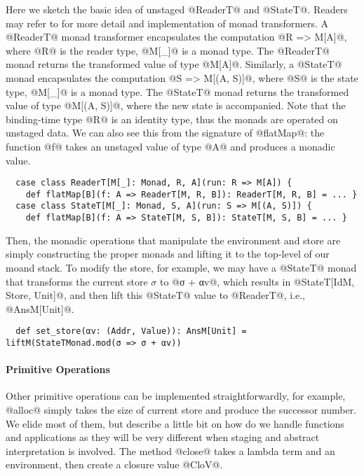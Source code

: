 Here we sketch the basic idea of unstaged @ReaderT@ and @StateT@. Readers may
refer to  for more detail and implementation of monad
transformers.
A @ReaderT@ monad transformer encapsulates the computation @R => M[A]@, where
@R@ is the reader type, @M[_]@ is a monad type. The @ReaderT@ monad returns the
transformed value of type @M[A]@. Similarly, a @StateT@ monad encapsulates the
computation @S => M[(A, S)]@, where @S@ is the state type, @M[_]@ is a monad
type. The @StateT@ monad returns the transformed value of type @M[(A, S)]@,
where the new state is accompanied.
Note that the binding-time type @R@ is an identity type, thus the monads are
operated on unstaged data. We can also see this from the signature of @flatMap@:
the function @f@ takes an unstaged value of type @A@ and produces a monadic
value.

\begin{lstlisting}
  case class ReaderT[M[_]: Monad, R, A](run: R => M[A]) {
    def flatMap[B](f: A => ReaderT[M, R, B]): ReaderT[M, R, B] = ... }
  case class StateT[M[_]: Monad, S, A](run: S => M[(A, S)]) {
    def flatMap[B](f: A => StateT[M, S, B]): StateT[M, S, B] = ... }
\end{lstlisting}

Then, the monadic operations that manipulate the environment and store are
simply constructing the proper monads and lifting it to the top-level of our
moand stack. To modify the store, for example, we may have a @StateT@ monad that
transforms the current store $\sigma$ to @σ + αv@, which results in
@StateT[IdM, Store, Unit]@, and then lift this @StateT@ value to @ReaderT@,
i.e., @AnsM[Unit]@.
\begin{lstlisting}
  def set_store(αv: (Addr, Value)): AnsM[Unit] = liftM(StateTMonad.mod(σ => σ + αv))
\end{lstlisting}

\paragraph{Primitive Operations}
Other primitive operations can be implemented straightforwardly, for example,
@alloc@ simply takes the size of current store and produce the successor number.
We elide most of them, but describe a little bit on how do we handle functions
and applications as they will be very different when staging and abstract
interpretation is involved. The method @close@ takes a lambda term and an
environment, then create a closure value @CloV@.

